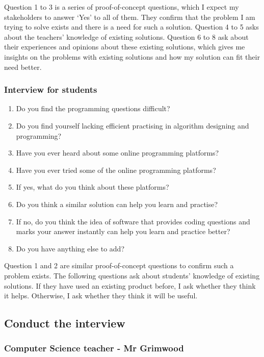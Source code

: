 \documentclass[a4paper]{report}
\begin{document}
Question 1 to 3 is a series of proof-of-concept questions, which I expect my stakeholders to answer `Yes' to all of them. They confirm that the problem I am trying to solve exists and there is a need for such a solution. Question 4 to 5 asks about the teachers' knowledge of existing solutions. Question 6 to 8 ask about their experiences and opinions about these existing solutions, which gives me insights on the problems with existing solutions and how my solution can fit their need better.

\subsubsection{Interview for students}

\begin{enumerate}
    \item Do you find the programming questions difficult?
    \item Do you find yourself lacking efficient practising in algorithm designing and programming?
    \item Have you ever heard about some online programming platforms?
    \item Have you ever tried some of the online programming platforms?
    \item If yes, what do you think about these platforms?
    \item Do you think a similar solution can help you learn and practise?
    \item If no, do you think the idea of software that provides coding questions and marks your answer instantly can help you learn and practice better?
    \item Do you have anything else to add?
\end{enumerate}

Question 1 and 2 are similar proof-of-concept questions to confirm such a problem exists. The following questions ask about students' knowledge of existing solutions. If they have used an existing product before, I ask whether they think it helps. Otherwise, I ask whether they think it will be useful.

\subsection{Conduct the interview}

\subsubsection{Computer Science teacher - Mr Grimwood}
\end{document}
